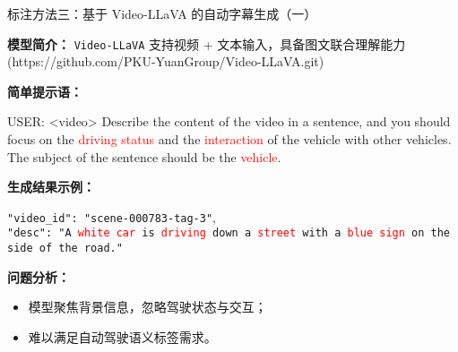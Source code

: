\documentclass[serif]{beamer}
\begin{document}
\begin{frame}{标注方法三：基于 Video-LLaVA 的自动字幕生成（一）}

\textbf{模型简介：} \texttt{Video-LLaVA} 支持视频 + 文本输入，具备图文联合理解能力(https://github.com/PKU-YuanGroup/Video-LLaVA.git)

\vspace{0.6em}
\textbf{简单提示语：}

\footnotesize
USER: <video> Describe the content of the video in a sentence, and you should focus on the \textcolor{red}{driving status} and the \textcolor{red}{interaction} of the vehicle with other vehicles. The subject of the sentence should be the \textcolor{red}{vehicle}.
\normalsize

\vspace{1em}
\textbf{生成结果示例：}

\texttt{"video\_id": "scene-000783-tag-3"},\\
\texttt{"desc": "A \textcolor{red}{white car} is \textcolor{red}{driving} down a \textcolor{red}{street} with a \textcolor{red}{blue sign} on the side of the road."}

\vspace{0.6em}
\textbf{问题分析：}
\begin{itemize}
  \item 模型聚焦背景信息，忽略驾驶状态与交互；
  \item 难以满足自动驾驶语义标签需求。
\end{itemize}

\end{frame}
\end{document}
